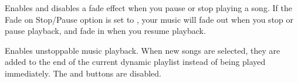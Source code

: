 \begin{description}
{    %
    
    
  \item[Fade On Stop/Pause. ]Enables and disables a fade effect when you
    pause or stop playing a song. If the Fade on Stop/Pause option is
    set to , your music will fade out when you stop or pause 
    playback, and fade in when you resume playback.
    
  \item[Party Mode. ]Enables unstoppable music playback.  When new songs are
    selected, they are added to the end of the current dynamic playlist
    instead of being played immediately.
    The  and  buttons are disabled.
    
}
\end{description}
